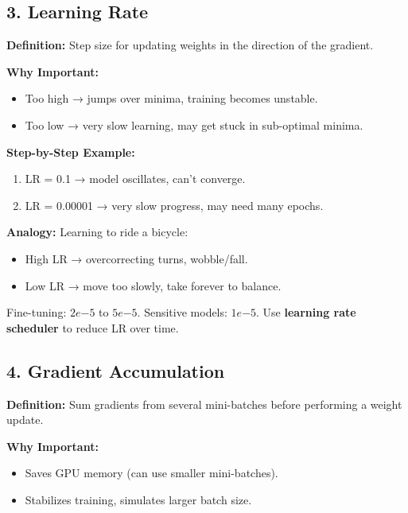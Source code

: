 \documentclass[a4paper, 12pt]{article}
\begin{document}
\subsection*{3. Learning Rate}
\textbf{Definition:} Step size for updating weights in the direction of the gradient.  

\textbf{Why Important:}  
\begin{itemize}
    \item Too high → jumps over minima, training becomes unstable.  
    \item Too low → very slow learning, may get stuck in sub-optimal minima.  
\end{itemize}

\textbf{Step-by-Step Example:}
\begin{enumerate}
    \item LR = 0.1 → model oscillates, can’t converge.  
    \item LR = 0.00001 → very slow progress, may need many epochs.  
\end{enumerate}

\textbf{Analogy:} Learning to ride a bicycle:  
\begin{itemize}
    \item High LR → overcorrecting turns, wobble/fall.  
    \item Low LR → move too slowly, take forever to balance.  
\end{itemize}

\begin{tcolorbox}[colback=blue!5,colframe=blue!70!black,title=Rule of Thumb]
Fine-tuning: $2e{-5}$ to $5e{-5}$.  
Sensitive models: $1e{-5}$.  
Use \textbf{learning rate scheduler} to reduce LR over time.
\end{tcolorbox}



\subsection*{4. Gradient Accumulation}
\textbf{Definition:} Sum gradients from several mini-batches before performing a weight update.  

\textbf{Why Important:}  
\begin{itemize}
    \item Saves GPU memory (can use smaller mini-batches).  
    \item Stabilizes training, simulates larger batch size.  
\end{itemize}
\end{document}
